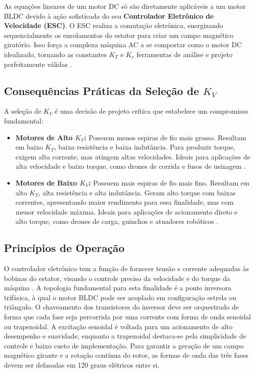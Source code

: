   As equações lineares de um motor DC só são diretamente aplicáveis a um motor BLDC devido à ação sofisticada do seu \textbf{Controlador Eletrônico de Velocidade (ESC)}. O ESC realiza a comutação eletrônica, energizando sequencialmente os enrolamentos do estator para criar um campo magnético giratório. Isso força a complexa máquina AC a se comportar como o motor DC idealizado, tornando as constantes $K_T$ e $K_e$ ferramentas de análise e projeto perfeitamente válidas \parencite{hendershot1994design}.

 \subsection{\texorpdfstring{Consequências Práticas da Seleção de $K_V$}{Consequências Práticas da Seleção de KV}} 

 A seleção de $K_V$ é uma decisão de projeto crítica que estabelece um compromisso fundamental: 
 \begin{itemize} 
 \item \textbf{Motores de Alto $K_V$:} Possuem menos espiras de fio mais grosso. Resultam em baixo $K_T$, baixa resistência e baixa indutância. Para produzir torque, exigem alta corrente, mas atingem altas velocidades. Ideais para aplicações de alta velocidade e baixo torque, como drones de corrida e fusos de usinagem \parencite{tmotor2019kv}. 
 \item \textbf{Motores de Baixo $K_V$:} Possuem mais espiras de fio mais fino. Resultam em alto $K_T$, alta resistência e alta indutância. Geram alto torque com baixas correntes, apresentando maior rendimento para essa finalidade, mas com menor velocidade máxima. Ideais para aplicações de acionamento direto e alto torque, como drones de carga, guinchos e atuadores robóticos \parencite{byod2018kv}. 
 \end{itemize} 

 \subsection{Princípios de Operação} 

 O controlador eletrônico tem a função de fornecer tensão e corrente adequadas às bobinas do estator, visando o controle preciso da velocidade e do torque da máquina \cite{jahns1996pulsating}. A topologia fundamental para esta finalidade é a ponte inversora trifásica, à qual o motor BLDC pode ser acoplado em configuração estrela ou triângulo. O chaveamento dos transistores do inversor deve ser orquestrado de forma que cada fase seja percorrida por uma corrente com forma de onda senoidal ou trapezoidal. A excitação senoidal é voltada para um acionamento de alto desempenho e suavidade, enquanto a trapezoidal destaca-se pela simplicidade de controle e baixo custo de implementação. Para garantir a geração de um campo magnético girante e a rotação contínua do rotor, as formas de onda das três fases devem ser defasadas em 120 graus elétricos entre si.


